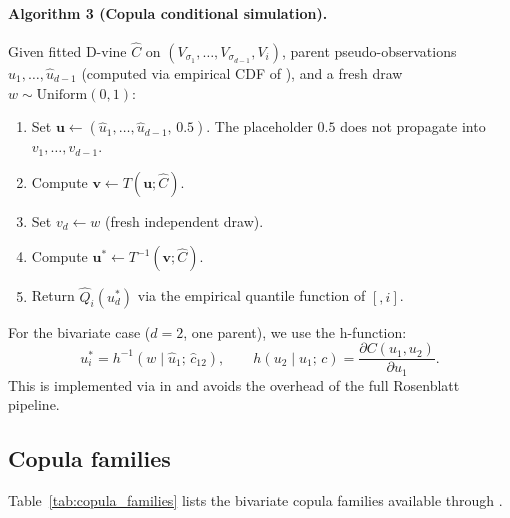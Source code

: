 \documentclass[article]{jss}
\begin{document}
\paragraph{Algorithm 3 (Copula conditional simulation).}
Given fitted D-vine $\hat{C}$ on $(V_{\sigma_1},\ldots,V_{\sigma_{d-1}},V_i)$,
parent pseudo-observations $\hat{u}_1,\ldots,\hat{u}_{d-1}$ (computed via
empirical CDF of ), and a fresh draw $w\sim\mathrm{Uniform}(0,1)$:
\begin{enumerate}
  \item Set $\mathbf{u}\leftarrow(\hat{u}_1,\ldots,\hat{u}_{d-1},\, 0.5)$.
        The placeholder $0.5$ does not propagate into $v_1,\ldots,v_{d-1}$.
  \item Compute $\mathbf{v}\leftarrow T(\mathbf{u};\hat{C})$.
  \item Set $v_d \leftarrow w$ (fresh independent draw).
  \item Compute $\mathbf{u}^*\leftarrow T^{-1}(\mathbf{v};\hat{C})$.
  \item Return $\hat{Q}_i(u_d^*)$ via the empirical quantile function of
        $[,i]$.
\end{enumerate}

\noindent For the bivariate case ($d=2$, one parent), we use the h-function:
\[
  u_i^* = h^{-1}(w \mid \hat{u}_1;\, \hat{c}_{12}), \qquad
  h(u_2\mid u_1;\,c) = \frac{\partial C(u_1,u_2)}{\partial u_1}.
\]
This is implemented via  in
 and avoids the overhead of the full Rosenblatt pipeline.

\subsection{Copula families}
\label{sec:families}

Table~\ref{tab:copula_families} lists the bivariate copula families available
through .
\end{document}
